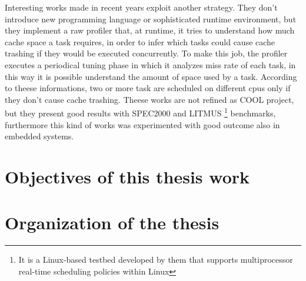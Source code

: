 Interesting works made in recent years exploit another strategy. They don't introduce new programming language or sophisticated runtime environment, but 
they implement a raw profiler that, at runtime, it tries to understand how much cache space a task requires, in order to infer which tasks could cause
cache trashing if they would be executed concurrently.
To make this job, the profiler executes a periodical tuning phase in which it analyzes miss rate of each task, in this way it is possible understand the 
amount of space used by a task. According to theese informations, two or more task are scheduled on different cpus only if 
they don't cause cache trashing. Theese works are not refined as COOL project, but they present good results with SPEC2000 and 
LITMUS \footnote{It is a Linux-based testbed developed by them that supports multiprocessor real-time scheduling policies within Linux} benchmarks, 
furthermore this kind of works was experimented with good outcome also in embedded systems.


\section{Objectives of this thesis work}
\label{sec:ObjectiveOfThesis}


\section{Organization of the thesis}
\label{sec:OrganizationThesis}

